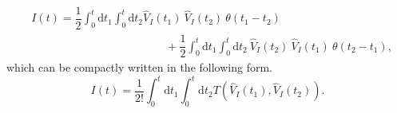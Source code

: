 \documentclass[12pt, titlepage]{article}
\begin{document}
\begin{equation*}
\begin{split}
&I(t)=\dfrac{1}{2}
\int_{0}^{t}\mathrm{d}t_1\int_{0}^{t}\! \! \mathrm{d}t_2
\hat{V}_{I}(t_1)\ \hat{V}_{I}(t_2)\ \theta (t_1 -t_2)
\\
&\qquad\qquad\qquad\qquad\qquad\qquad
+
\dfrac{1}{2}
\int_{0}^{t}\mathrm{d}t_1\int_{0}^{t}\! \! \mathrm{d}t_2
\ \hat{V}_{I}(t_2)\  \hat{V}_{I}(t_1) \ \theta (t_2-t_1)
,
\end{split}
\end{equation*}
which can be compactly written in the following form.
\begin{equation}
I(t)=\dfrac{1}{2!}
\int_{0}^{t}\mathrm{d}t_1\int_{0}^{t}\! \! \mathrm{d}t_2
T(\hat{V}_{I}(t_1),\hat{V}_{I}(t_2))
.
\end{equation}
\end{document}
